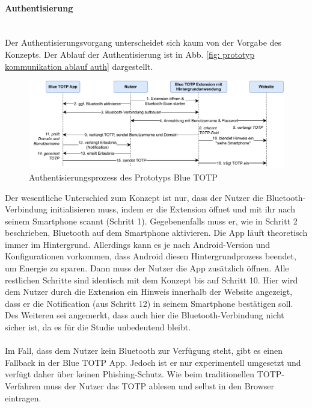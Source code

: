 \paragraph*{Authentisierung}
\mbox{} \vspace{0.1cm} \\
Der Authentisierungsvorgang unterscheidet sich kaum von der Vorgabe des 
Konzepts. Der Ablauf der Authentisierung ist in Abb. \ref{fig: prototyp 
kommunikation ablauf auth} dargestellt.
\begin{figure}[h]
    \centering
    \includegraphics[width=1\linewidth]{figures/impl/blue_totp_login.pdf}
    \caption[Authentisierungsprozess des Prototyps Blue TOTP]{Authentisierungsprozess des Prototyps Blue TOTP}
    \label{fig: prototyp kommunikation ablauf auth}
\end{figure}
Der wesentliche Unterschied zum Konzept ist nur, dass der Nutzer die 
Bluetooth-Verbindung initialisieren muss, indem er die Extension öffnet und 
mit ihr nach seinem Smartphone scannt (Schritt 1). Gegebenenfalls muss er, 
wie in Schritt 2 beschrieben, Bluetooth auf dem Smartphone aktivieren. Die 
App läuft theoretisch immer im Hintergrund. Allerdings kann es je nach 
Android-Version und Konfigurationen vorkommen, dass Android diesen 
Hintergrundprozess beendet, um Energie zu sparen. Dann muss der Nutzer die 
App zusätzlich öffnen. Alle restlichen Schritte sind identisch mit dem 
Konzept bis auf Schritt 10. Hier wird dem Nutzer durch die Extension ein 
Hinweis innerhalb der Website angezeigt, dass er die Notification (aus 
Schritt 12) in seinem Smartphone bestätigen soll. Des Weiteren sei angemerkt, 
dass auch hier die Bluetooth-Verbindung nicht sicher ist, da es für die 
Studie unbedeutend bleibt.
\\\\
Im Fall, dass dem Nutzer kein Bluetooth zur Verfügung steht, gibt es einen 
Fallback in der Blue TOTP App. Jedoch ist er nur experimentell umgesetzt und 
verfügt daher über keinen Phishing-Schutz. Wie beim traditionellen 
TOTP-Verfahren muss der Nutzer das TOTP ablesen und selbst in den Browser 
eintragen.